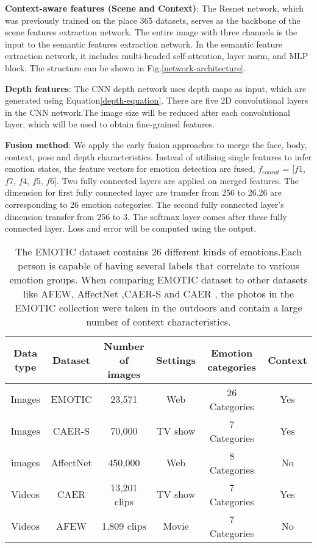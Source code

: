 \documentclass[conference]{IEEEtran}
\begin{document}
\textbf{Context-aware features (Scene and Context)}: The Resnet network, which was previously trained on the place 365 datasets, serves as the backbone of the scene features extraction network. The entire image with three channels is the input to the semantic features extraction network. In the semantic feature extraction network, it includes multi-headed self-attention, layer norm, and MLP block. The structure can be shown in Fig.\ref{network-architecture}. 

\textbf{Depth features}: The CNN depth network uses depth maps as input, which are generated using Equation\ref{depth-equation}. There are five 2D convolutional layers in the CNN network.The image size will be reduced after each convolutional layer, which will be used to obtain fine-grained features.

\textbf{Fusion method}: We apply the early fusion approaches to merge the face, body,   context, pose and depth characteristics. Instead of utilising single features to infer emotion states, the feature vectors for emotion detection are fused, $f_{concat}$ = [$f1$, $f7$, $f4$, $f5$, $f6$]. Two fully connected layers are applied on merged features. The dimension for first fully connected layer are  transfer from  256 to 26.26 are corresponding to 26 emotion categories. The second fully connected layer's dimension transfer from 256 to 3. The softmax layer comes after these  fully connected layer. Loss and error will be computed using the output. 

\begin{table*}[htbp]
\centering
\caption{The EMOTIC dataset contains 26 different kinds of emotions.Each person is capable of having several labels that correlate to various emotion groups. When comparing EMOTIC dataset  \cite{ref-35} to other datasets like AFEW\cite{ref-32},  AffectNet \cite{ref-34},CAER-S  \cite{ref-33} and CAER  \cite{ref-33} , the photos in the EMOTIC collection were taken in the outdoors and contain a large number of context characteristics.}
\begin{tabular}{c c c c c c} 
\hline \hline
 Data type& Dataset & Number of images  & Settings  & Emotion categories  & Context \\ 
\hline
 Images & EMOTIC \cite{ref-35}&  23,571 & Web &  26 Categories & Yes \\ 
\hline
 Images &CAER-S \cite{ref-33} & 70,000  & TV show & 7 Categories & Yes  \\ 
\hline
 images &AffectNet \cite{ref-34} & 450,000  &  Web&  8 Categories & No \\ 
\hline
 Videos &CAER \cite{ref-33} &13,201 clips  &TV show & 7 Categories  & Yes \\ 
\hline
Videos & AFEW \cite{ref-32} & 1,809 clips  &Movie & 7 Categories & No \\
\hline
\end{tabular}
 \label{datasets-compare}
\end{table*}
\end{document}
